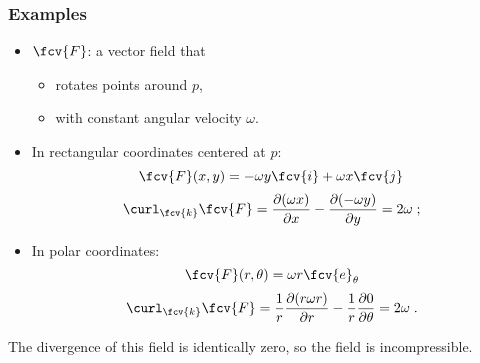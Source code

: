 \begin{frame}
\small
  \frametitle{Examples}

\begin{itemize}
  \item $\fcv{F}$: a vector field that
  \begin{itemize}
    \item rotates points around $p$,
    \item with constant angular velocity $\omega$.
  \end{itemize}
  \item \pause In rectangular coordinates centered at $p$:
  $$\fcv{F}(x,y) = -\omega y \fcv{i} + \omega x \fcv{j}$$
  $$\curl_{\fcv{k}} \fcv{F} = \frac{\partial (\omega x)}{\partial x} - \frac{\partial (-\omega y)}{\partial y} = 2\omega \; ;$$
  \item \pause In polar coordinates:
  $$\fcv{F}(r, \theta) = \omega r \fcv{e}_{\theta}$$
$$\curl_{\fcv{k}} \fcv{F} = \frac{1}{r}\frac{\partial (r \omega r)}{\partial r} - \frac{1}{r}\frac{\partial 0}{\partial \theta} = 2\omega \; .$$
\end{itemize}

\pause The divergence of this field is identically zero, so the field is incompressible.

\end{frame}